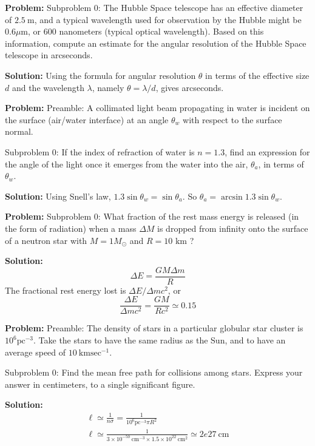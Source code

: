 \documentclass[10pt]{article}
\begin{document}
\textbf{Problem:}
Subproblem 0: The Hubble Space telescope has an effective diameter of $2.5 \mathrm{~m}$, and a typical wavelength used for observation by the Hubble might be $0.6 \mu \mathrm{m}$, or 600 nanometers (typical optical wavelength). Based on this information, compute an estimate for the angular resolution of the Hubble Space telescope in arcseconds.


\textbf{Solution:}
Using the formula for angular resolution $\theta$ in terms of the effective size $d$ and the wavelength $\lambda$, namely $\theta = \lambda/d$, gives  arcseconds.


\textbf{Problem:}
Preamble: A collimated light beam propagating in water is incident on the surface (air/water interface) at an angle $\theta_w$ with respect to the surface normal.

Subproblem 0: If the index of refraction of water is $n=1.3$, find an expression for the angle of the light once it emerges from the water into the air, $\theta_a$, in terms of $\theta_w$.


\textbf{Solution:}
Using Snell's law, $1.3 \sin{\theta_w} = \sin{\theta_a}$. So $\theta_a = \boxed{\arcsin{1.3 \sin{\theta_w}}}$.


\textbf{Problem:}
Subproblem 0: What fraction of the rest mass energy is released (in the form of radiation) when a mass $\Delta M$ is dropped from infinity onto the surface of a neutron star with $M=1 M_{\odot}$ and $R=10$ $\mathrm{km}$ ?


\textbf{Solution:}
\[
\Delta E=\frac{G M \Delta m}{R}
\]
The fractional rest energy lost is $\Delta E / \Delta m c^{2}$, or
\[
\frac{\Delta E}{\Delta m c^{2}}=\frac{G M}{R c^{2}} \simeq \boxed{0.15}
\]


\textbf{Problem:}
Preamble: The density of stars in a particular globular star cluster is $10^{6} \mathrm{pc}^{-3}$. Take the stars to have the same radius as the Sun, and to have an average speed of $10 \mathrm{~km} \mathrm{sec}^{-1}$.

Subproblem 0: Find the mean free path for collisions among stars.  Express your answer in centimeters, to a single significant figure.


\textbf{Solution:}
\[
\begin{gathered}
\ell \simeq \frac{1}{n \sigma}=\frac{1}{10^{6} \mathrm{pc}^{-3} \pi R^{2}} \\
\ell \simeq \frac{1}{3 \times 10^{-50} \mathrm{~cm}^{-3} \times 1.5 \times 10^{22} \mathrm{~cm}^{2}} \simeq \boxed{2e27} \mathrm{~cm}
\end{gathered}
\]
\end{document}
